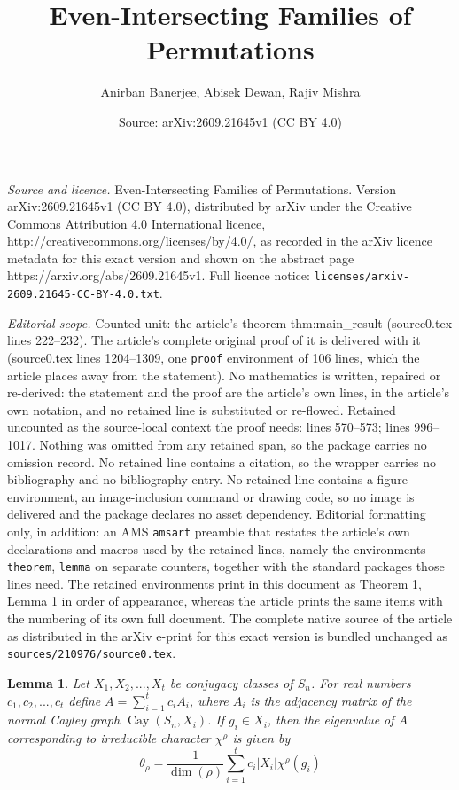 \documentclass[10pt,a4paper]{amsart}
\title{Even-Intersecting Families of Permutations}
\author{Anirban Banerjee, Abisek Dewan, Rajiv Mishra}
\date{Source: arXiv:2609.21645v1 (CC BY 4.0)}
\newtheorem{lemma}{Lemma}
\newcommand{\Cay}{\operatorname{Cay}}
\begin{document}
\maketitle

\noindent\emph{Source and licence.} Even-Intersecting Families of Permutations. Version arXiv:2609.21645v1 (CC BY 4.0), distributed by arXiv under the Creative Commons Attribution 4.0 International licence, http://creativecommons.org/licenses/by/4.0/, as recorded in the arXiv licence metadata for this exact version and shown on the abstract page https://arxiv.org/abs/2609.21645v1. Full licence notice: \texttt{licenses/arxiv-2609.21645-CC-BY-4.0.txt}.\par\smallskip

\noindent\textit{Editorial scope.} Counted unit: the article's theorem thm:main\_result (source0.tex lines 222--232). The article's complete original proof of it is delivered with it (source0.tex lines 1204--1309, one \texttt{proof} environment of 106 lines, which the article places away from the statement). No mathematics is written, repaired or re-derived: the statement and the proof are the article's own lines, in the article's own notation, and no retained line is substituted or re-flowed.  Retained uncounted as the source-local context the proof needs: lines 570--573; lines 996--1017.  Nothing was omitted from any retained span, so the package carries no omission record.  No retained line contains a citation, so the wrapper carries no bibliography and no bibliography entry.  No retained line contains a figure environment, an image-inclusion command or drawing code, so no image is delivered and the package declares no asset dependency.  Editorial formatting only, in addition: an AMS \texttt{amsart} preamble that restates the article's own declarations and macros used by the retained lines, namely the environments \texttt{theorem}, \texttt{lemma} on separate counters, together with the standard packages those lines need.  The retained environments print in this document as Theorem 1, Lemma 1 in order of appearance, whereas the article prints the same items with the numbering of its own full document.  The complete native source of the article as distributed in the arXiv e-print for this exact version is bundled unchanged as \texttt{sources/210976/source0.tex}.
\begin{lemma}\label{lem:Weighted_Adjacency_eigenvlues}
 Let $X_1,X_2,...,X_t$ be conjugacy classes of $S_n$. For real numbers $c_1,c_2,...,c_t$ define $A=\sum_{i=1}^{t}c_i A_i$, where $A_i$ is the adjacency matrix of the normal Cayley graph $\Cay(S_n,X_i)$. If $g_i \in X_i$, then the eigenvalue of $A$ corresponding to irreducible character $\chi^{\rho}$ is given by
    \[\theta_{\rho}=\frac{1}{\dim(\rho)} \sum_{i=1}^{t}c_i|X_i| \chi^{\rho}(g_i)\]
\end{lemma}
\end{document}
